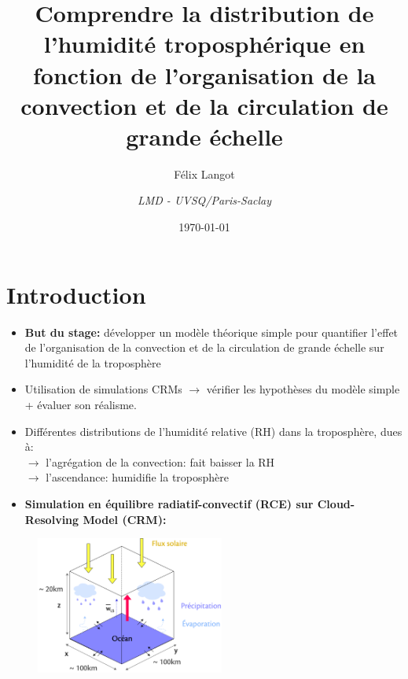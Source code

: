 \documentclass[10pt]{beamer}
\title{Comprendre la distribution de l'humidité troposphérique en fonction de l'organisation de la convection et de la circulation de grande échelle}
\subtitle{Félix Langot}
\date{\today}
\author{\textit{LMD - UVSQ/Paris-Saclay}}
\institute{}
\begin{document}
\maketitle

\section*{Introduction}
\begin{frame}{\secname}

    \begin{itemize}
        \setlength{\itemsep}{7pt}
        \item \textbf{But du stage:} développer un modèle théorique simple pour quantifier l'effet de l'organisation de la convection et de la circulation de grande échelle sur l'humidité de la troposphère 
        \item Utilisation de simulations CRMs $\rightarrow$ vérifier les hypothèses du modèle simple + évaluer son réalisme. 
        \item Différentes distributions de l'humidité relative (RH) dans la troposphère, dues à: \\
        $\rightarrow$ l'agrégation de la convection: fait baisser la RH  \autocite{Tobin2012} \\
        $\rightarrow$ l'ascendance: humidifie la troposphère \autocite{dufauxRapportStageLicence2021} \\
    \end{itemize}

\end{frame}

\begin{frame}{\secname}
    \begin{itemize}
        \item \textbf{Simulation en équilibre radiatif-convectif (RCE) sur Cloud-Resolving  Model  (CRM):}
    \end{itemize}
    \begin{figure}[hbtp]
        \centering
        \includegraphics[width=6.2cm]{Figures/CRM.png}    
    \end{figure}
\end{frame}
\end{document}
